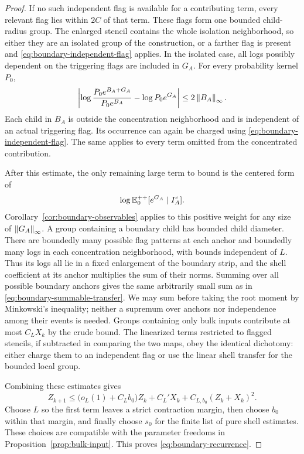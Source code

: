 \begin{proof}
If no such independent flag is available for a contributing term,
every relevant flag lies within $2C$ of that term.  These flags form
one bounded child-radius group.  The enlarged stencil contains the
whole isolation neighborhood, so either they are an isolated group
of the construction, or a farther flag is present and
\eqref{eq:boundary-independent-flag} applies.  In the isolated case,
all logs possibly dependent on the triggering flags are included in
$G_A$.  For every probability kernel $P_0$,
\begin{equation}\label{eq:boundary-remove-background}
 \left|\log\frac{P_0e^{B_A+G_A}}{P_0e^{B_A}}
                    -\log P_0e^{G_A}\right|
 \le2\left\lVert B_A\right\rVert_\infty.
\end{equation}
Each child in $B_A$ is outside the concentration neighborhood and is
independent of an actual triggering flag.  Its occurrence can again be
charged using \eqref{eq:boundary-independent-flag}.  The same applies
to every term omitted from the concentrated contribution.

After this estimate, the only remaining large term to bound is the
centered form of
\[
 \log\mathbb E_0^{++}[e^{G_A}\mid I_A^c].
\]
Corollary~\ref{cor:boundary-observables} applies to this positive
weight for any size of $\left\lVert G_A\right\rVert_\infty$.  A group containing a
boundary child has bounded child diameter.  There are boundedly many
possible flag patterns at each anchor and boundedly many logs in each
concentration neighborhood, with bounds independent of $L$.
Thus its logs all lie in
a fixed enlargement of the boundary strip, and the shell coefficient
at its anchor multiplies the sum of their norms.  Summing over all
possible boundary anchors gives the same arbitrarily small sum as in
\eqref{eq:boundary-summable-transfer}.  We may sum before taking the
root moment by Minkowski's inequality; neither a supremum over anchors
nor independence among their events is needed.  Groups containing
only bulk inputs contribute at most $C_LX_k$ by the crude bound.
The linearized terms restricted to flagged stencils, if subtracted in
comparing the two maps, obey the identical dichotomy: either charge
them to an independent flag or use the linear shell transfer for the
bounded local group.

Combining these estimates gives
\[
 Z_{k+1}\le
  \bigl(o_L(1)+C_Lb_0\bigr)Z_k+C_L'X_k
                   +C_{L,b_0}(Z_k+X_k)^2.
\]
Choose $L$ so the first term leaves a strict contraction margin, then
choose $b_0$ within that margin, and finally choose $s_0$ for the
finite list of pure shell estimates.  These choices are compatible
with the parameter freedoms in Proposition~\ref{prop:bulk-input}.
This proves \eqref{eq:boundary-recurrence}.


\end{proof}

